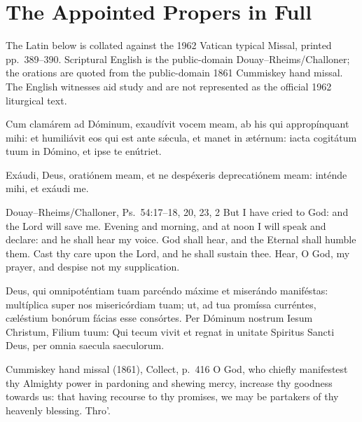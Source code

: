 \section*{The Appointed Propers in Full}

\noindent The Latin below is collated against the 1962 Vatican typical Missal,
printed pp.~389--390. Scriptural English is the public-domain
Douay--Rheims/Challoner; the orations are quoted from the public-domain 1861
Cummiskey hand missal. The English witnesses aid study and are not represented
as the official 1962 liturgical text.

Cum clamárem ad Dóminum, exaudívit vocem meam, ab his qui appropínquant mihi:
et humiliávit eos qui est ante s\'{\ae}cula, et manet in ætérnum: iacta cogitátum
tuum in Dómino, et ipse te enútriet.

\medskip\noindent{} Exáudi, Deus, oratiónem meam, et ne despéxeris
deprecatiónem meam: inténde mihi, et exáudi me.
\finishfulltextelement
\begin{fulltextenglish}{Douay--Rheims/Challoner, Ps.~54:17--18, 20, 23, 2}
But I have cried to God: and the Lord will save me. Evening and morning, and
at noon I will speak and declare: and he shall hear my voice. God shall hear,
and the Eternal shall humble them. Cast thy care upon the Lord, and he shall
sustain thee. Hear, O God, my prayer, and despise not my supplication.
\end{fulltextenglish}

Deus, qui omnipoténtiam tuam parcéndo máxime et miserándo maniféstas:
multíplica super nos misericórdiam tuam; ut, ad tua promíssa curréntes,
cæléstium bonórum fácias esse consórtes. Per Dóminum nostrum Iesum Christum,
Filium tuum: Qui tecum vivit et regnat in unitate Spiritus Sancti Deus, per
omnia saecula saeculorum.
\finishfulltextelement
\begin{fulltextenglish}{Cummiskey hand missal (1861), Collect, p.~416}
O God, who chiefly manifestest thy Almighty power in pardoning and shewing
mercy, increase thy goodness towards us: that having recourse to thy promises,
we may be partakers of thy heavenly blessing. Thro'.
\end{fulltextenglish}

